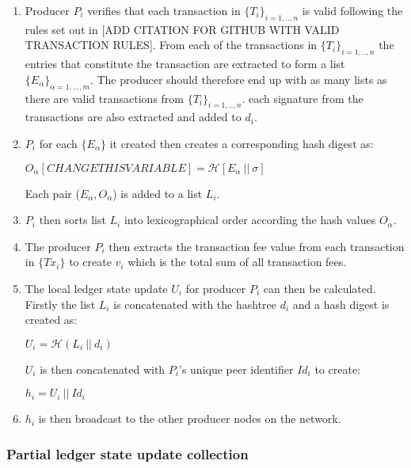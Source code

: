 \documentclass{article}
\begin{document}
\begin{enumerate}
\item Producer $P_i$ verifies that each transaction in $\{T_i\}_{i=1,..,n}$ is valid following the rules set out in [ADD CITATION FOR GITHUB WITH VALID TRANSACTION RULES]. From each of the transactions in $\{T_i\}_{i=1,..,n}$ the entries that constitute the transaction are extracted to form a list $\{E_\alpha\}_{\alpha=1,...,m}$. The producer should therefore end up with as many lists as there are valid transactions from $\{T_i\}_{i=1,..,n}$. each signature from the transactions are also extracted and added to $d_i$.

\item $P_i$ for each $\{E_\alpha\}$ it created then creates a corresponding hash digest as: 
\begin{center}
$O_\alpha [CHANGE THIS VARIABLE] = \mathcal{H}[E_\alpha~||~\sigma]$
\end{center}

Each pair ($E_\alpha,O_\alpha$) is added to a list $L_i$. 

\item $P_i$ then sorts list $L_i$ into lexicographical order according the hash values $O_\alpha$.

\item The producer $P_i$ then extracts the transaction fee value from each transaction in $\{Tx_i\}$ to create $v_i$ which is the total sum of all transaction fees. 

\item The local ledger state update $U_i$ for producer $P_i$ can then be calculated. Firstly the list $L_i$ is concatenated with the hashtree $d_i$ and a hash digest is created as: 

\begin{center}
$U_i = \mathcal{H}(L_i~||~d_i)$
\end{center}  

$U_i$ is then concatenated with $P_i$'s unique peer identifier $Id_i$ to create:

\begin{center} 
$h_i = U_i ~||~Id_i$
\end{center}

\item $h_i$ is then broadcast to the other producer nodes on the network. 
\end{enumerate}

\subsubsection{Partial ledger state update collection}
\end{document}
